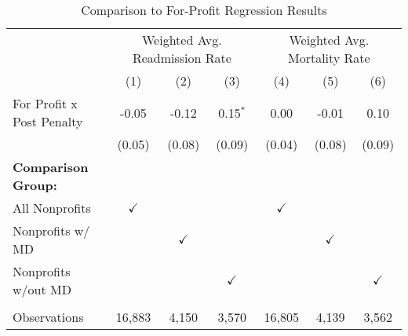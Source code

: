 \begin{table}[htbp]
   \caption{\label{tab:forprofit_fullsample} Comparison to For-Profit Regression Results}
   \bigskip
   \centering
   \begin{tabular}{lcccccc}
      \toprule
       & \multicolumn{3}{c}{Weighted Avg. Readmission Rate} & \multicolumn{3}{c}{Weighted Avg. Mortality Rate}\\
                                  & (1)           & (2)           & (3)           & (4)           & (5)           & (6)\\  
      \midrule 
      For Profit x Post Penalty   & -0.05         & -0.12         & 0.15$^{*}$    & 0.00          & -0.01         & 0.10\\   
                                  & (0.05)        & (0.08)        & (0.09)        & (0.04)        & (0.08)        & (0.09)\\   
      \textbf{Comparison Group:}  &               &               &               &               &               & \\  
      All Nonprofits              & $\checkmark$  &               &               & $\checkmark$  &               & \\  
      Nonprofits w/ MD            &               & $\checkmark$  &               &               & $\checkmark$  & \\  
      Nonprofits w/out MD         &               &               & $\checkmark$  &               &               & $\checkmark$\\   
       \\
      Observations                & 16,883        & 4,150         & 3,570         & 16,805        & 4,139         & 3,562\\  
      \bottomrule
   \end{tabular}
\end{table}
